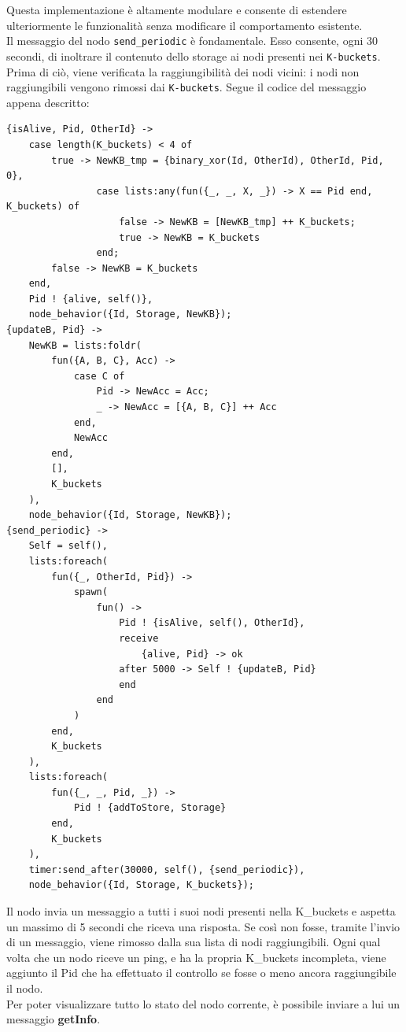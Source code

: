 \documentclass{article}
\begin{document}
Questa implementazione è altamente modulare e consente di estendere ulteriormente le funzionalità senza modificare il comportamento esistente.\\
Il messaggio del nodo \texttt{send\_periodic} è fondamentale. Esso consente, ogni 30 secondi, di inoltrare il contenuto dello storage ai nodi presenti nei \texttt{K-buckets}. Prima di ciò, viene verificata la raggiungibilità dei nodi vicini: i nodi non raggiungibili vengono rimossi dai \texttt{K-buckets}.
Segue il codice del messaggio appena descritto:
\begin{lstlisting}
{isAlive, Pid, OtherId} ->
    case length(K_buckets) < 4 of
        true -> NewKB_tmp = {binary_xor(Id, OtherId), OtherId, Pid, 0},
                case lists:any(fun({_, _, X, _}) -> X == Pid end, K_buckets) of
                    false -> NewKB = [NewKB_tmp] ++ K_buckets;
                    true -> NewKB = K_buckets
                end;
        false -> NewKB = K_buckets
    end,
    Pid ! {alive, self()},
    node_behavior({Id, Storage, NewKB});
{updateB, Pid} ->
    NewKB = lists:foldr(
        fun({A, B, C}, Acc) ->
            case C of
                Pid -> NewAcc = Acc;
                _ -> NewAcc = [{A, B, C}] ++ Acc
            end,
            NewAcc
        end,
        [],
        K_buckets
    ),
    node_behavior({Id, Storage, NewKB});
{send_periodic} ->
    Self = self(),
    lists:foreach(
        fun({_, OtherId, Pid}) ->
            spawn(
                fun() ->
                    Pid ! {isAlive, self(), OtherId},
                    receive
                        {alive, Pid} -> ok
                    after 5000 -> Self ! {updateB, Pid}
                    end
                end
            )
        end,
        K_buckets
    ),
    lists:foreach(
        fun({_, _, Pid, _}) ->
            Pid ! {addToStore, Storage}
        end,
        K_buckets
    ),
    timer:send_after(30000, self(), {send_periodic}),
    node_behavior({Id, Storage, K_buckets});
\end{lstlisting}
Il nodo invia un messaggio a tutti i suoi nodi presenti nella K\_buckets e aspetta un massimo di 5 secondi che riceva una risposta. Se così non fosse, tramite l'invio di un messaggio, viene rimosso dalla sua lista di nodi raggiungibili. Ogni qual volta che un nodo riceve un ping, e ha la propria K\_buckets incompleta, viene aggiunto il Pid che ha effettuato il controllo se fosse o meno ancora raggiungibile il nodo.\\

Per poter visualizzare tutto lo stato del nodo corrente, è possibile inviare a lui un messaggio \textbf{getInfo}.
\end{document}
